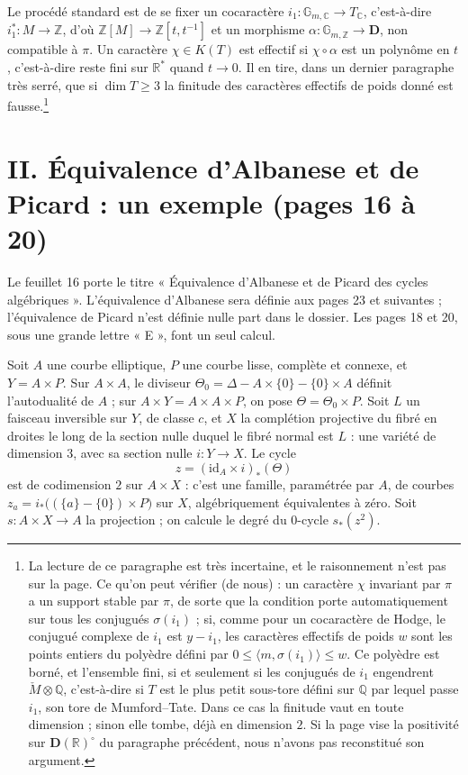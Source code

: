\documentclass[11pt,a4paper]{article}
\begin{document}
Le procédé standard est de se fixer un cocaractère $i_{1} \colon
\mathbb{G}_{m,\mathbb{C}} \to T_{\mathbb{C}}$, c'est-à-dire $i_{1}^{*} \colon M
\to \mathbb{Z}$, d'où $\mathbb{Z}[M] \to \mathbb{Z}[t, t^{-1}]$ et un morphisme
$\alpha \colon \mathbb{G}_{m,\mathbb{Z}} \to \mathbf{D}$, non compatible à
$\pi$. Un caractère $\chi \in K(T)$ est effectif si $\chi \circ \alpha$ est un
polynôme en $t$, c'est-à-dire reste fini sur $\mathbb{R}^{*}$ quand $t \to 0$.
Il en tire, dans un dernier paragraphe très serré, que si $\dim T \geqslant 3$
la finitude des caractères effectifs de poids donné est
fausse.\footnote{La lecture de ce paragraphe est très incertaine, et le
raisonnement n'est pas sur la page. Ce qu'on peut vérifier (de nous) : un
caractère $\chi$ invariant par $\pi$ a un support stable par $\pi$, de sorte que
la condition porte automatiquement sur tous les conjugués $\sigma(i_{1})$ ; si,
comme pour un cocaractère de Hodge, le conjugué complexe de $i_{1}$ est $y -
i_{1}$, les caractères effectifs de poids $w$ sont les points entiers du
polyèdre défini par $0 \leqslant \langle m, \sigma(i_{1})\rangle \leqslant w$.
Ce polyèdre est borné, et l'ensemble fini, si et seulement si les conjugués de
$i_{1}$ engendrent $\check{M} \otimes \mathbb{Q}$, c'est-à-dire si $T$ est le
plus petit sous-tore défini sur $\mathbb{Q}$ par lequel passe $i_{1}$, son
tore de Mumford--Tate. Dans ce cas la finitude vaut en toute dimension ;
sinon elle tombe, déjà en dimension $2$. Si la page vise la positivité sur
$\mathbf{D}(\mathbb{R})^{\circ}$ du paragraphe précédent, nous n'avons pas
reconstitué son argument.}

\section*{II. Équivalence d'Albanese et de Picard : un exemple (pages 16 à 20)}

Le feuillet 16 porte le titre « Équivalence d'Albanese et de Picard des cycles
algébriques ». L'équivalence d'Albanese sera définie aux pages 23 et suivantes ;
l'équivalence de Picard n'est définie nulle part dans le dossier. Les pages 18
et 20, sous une grande lettre « E », font un seul calcul.

Soit $A$ une courbe elliptique, $P$ une courbe lisse, complète et connexe, et $Y
= A \times P$. Sur $A \times A$, le diviseur $\Theta_{0} = \Delta - A \times
\{0\} - \{0\} \times A$ définit l'autodualité de $A$ ; sur $A \times Y = A
\times A \times P$, on pose $\Theta = \Theta_{0} \times P$. Soit $L$ un faisceau
inversible sur $Y$, de classe $c$, et $X$ la complétion projective du fibré en
droites le long de la section nulle duquel le fibré normal est $L$ : une
variété de dimension $3$, avec sa section nulle $i \colon Y \to X$. Le cycle
\[
z = (\mathrm{id}_{A} \times i)_{*}(\Theta)
\]
est de codimension $2$ sur $A \times X$ : c'est une famille, paramétrée par
$A$, de courbes $z_{a} = i_{*}\bigl((\{a\} - \{0\}) \times P\bigr)$ sur $X$,
algébriquement équivalentes à zéro. Soit $s \colon A \times X \to A$ la
projection ; on calcule le degré du $0$-cycle $s_{*}(z^{2})$.
\end{document}
